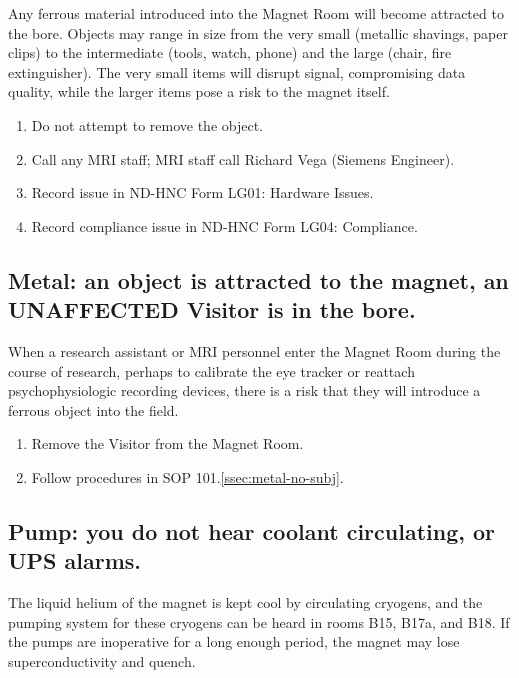 \documentclass[11pt]{article}
\begin{document}
Any ferrous material introduced into the Magnet Room will become attracted to the bore. Objects may range in size from the very small (metallic shavings, paper clips) to the intermediate (tools, watch, phone) and the large (chair, fire extinguisher). The very small items will disrupt signal, compromising data quality, while the larger items pose a risk to the magnet itself.

\begin{enumerate}
	\item Do not attempt to remove the object.
	\item Call any MRI staff; MRI staff call Richard Vega (Siemens Engineer).
	\item Record issue in ND-HNC Form LG01: Hardware Issues.
	\item Record compliance issue in ND-HNC Form LG04: Compliance.
\end{enumerate}


\subsection{Metal: an object is attracted to the magnet, an UNAFFECTED Visitor is in the bore.}
\label{ssec:metal-un-subj}

When a research assistant or MRI personnel enter the Magnet Room during the course of research, perhaps to calibrate the eye tracker or reattach psychophysiologic recording devices, there is a risk that they will introduce a ferrous object into the field.

\begin{enumerate}
	\item Remove the Visitor from the Magnet Room.
	\item Follow procedures in SOP 101.\ref{ssec:metal-no-subj}.
\end{enumerate}


\subsection{Pump: you do not hear coolant circulating, or UPS alarms.}
\label{ssec:pump}

The liquid helium of the magnet is kept cool by circulating cryogens, and the pumping system for these cryogens can be heard in rooms B15, B17a, and B18. If the pumps are inoperative for a long enough period, the magnet may lose superconductivity and quench.\\
\end{document}

